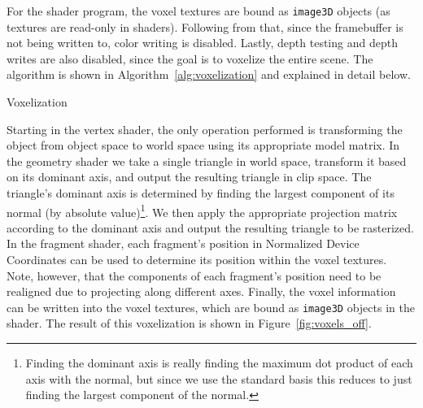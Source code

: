 For the shader program, the voxel textures are bound as \texttt{image3D} objects (as textures are read-only in shaders). Following from that, since the framebuffer is not being written to, color writing is disabled. Lastly, depth testing and depth writes are also disabled, since the goal is to voxelize the entire scene. The algorithm is shown in Algorithm~\ref{alg:voxelization} and explained in detail below.

\begin{algorithm}
    \caption{Voxelization}
    \label{alg:voxelization}
    \begin{algorithmic}
        \EndFor
         
        \EndFor

    \end{algorithmic}
\end{algorithm}

Starting in the vertex shader, the only operation performed is transforming the object from object space to world space using its appropriate model matrix. In the geometry shader we take a single triangle in world space, transform it based on its dominant axis, and output the resulting triangle in clip space. The triangle's dominant axis is determined by finding the largest component of its normal (by absolute value)\footnote{Finding the dominant axis is really finding the maximum dot product of each axis with the normal, but since we use the standard basis this reduces to just finding the largest component of the normal.}. We then apply the appropriate projection matrix according to the dominant axis and output the resulting triangle to be rasterized. In the fragment shader, each fragment's position in Normalized Device Coordinates can be used to determine its position within the voxel textures. Note, however, that the components of each fragment's position need to be realigned due to projecting along different axes. Finally, the voxel information can be written into the voxel textures, which are bound as \texttt{image3D} objects in the shader. The result of this voxelization is shown in Figure~\ref{fig:voxels_off}.

